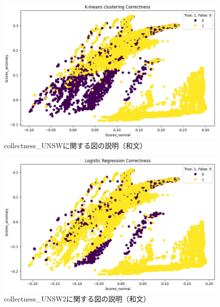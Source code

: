 \documentclass{css}
\begin{document}
\begin{figure}[tb]
    \centering
    \includegraphics[width=\linewidth]{pictures/eps/collectness_UNSW.eps}
    \caption{collectness\_UNSWに関する図の説明（和文）}
    \label{fig:collectness_UNSW}
\end{figure}

\begin{figure}[tb]
    \centering
    \includegraphics[width=\linewidth]{pictures/eps/collectness_UNSW2.eps}
    \caption{collectness\_UNSW2に関する図の説明（和文）}
    \label{fig:collectness_UNSW2}
\end{figure}
\end{document}
